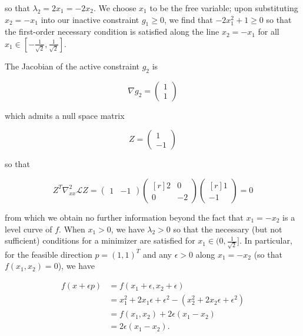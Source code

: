 \begin{solution}
    so that $\lambda_2 = 2 x_1 = -2 x_2$. We choose $x_1$ to be the free variable; upon substituting $x_2 = -x_1$ into 
    our inactive constraint $g_1 \ge 0$, we find that $-2 x_1^2 + 1 \ge 0$ so that the first-order necessary condition 
    is satisfied along the line $x_2 = -x_1$ for all $x_1 \in \left[ -\frac{1}{\sqrt{2}}, \frac{1}{\sqrt{2}} \right]$.

    The Jacobian of the active constraint $g_2$ is

    $$
    \nabla g_2 = \begin{pmatrix*}
        1 \\
        1
    \end{pmatrix*}
    $$

    which admits a null space matrix

    $$
    Z = \begin{pmatrix*}
         1 \\
        -1
    \end{pmatrix*}
    $$

    so that 

    $$
    Z^T \nabla_{xx}^2 \mathcal{L} Z = \begin{pmatrix*}
        1 & -1
    \end{pmatrix*} \begin{pmatrix*}[r]
        2 & 0 \\
        0 & -2
    \end{pmatrix*} \begin{pmatrix*}[r]
        1 \\
        -1
    \end{pmatrix*} = 0
    $$

    from which we obtain no further information beyond the fact that $x_1 = -x_2$ is a level curve of $f$. When 
    $x_1 > 0$, we have $\lambda_2 > 0$ so that the necessary (but not sufficient) conditions for a minimizer are 
    satisfied for $x_1 \in \mathopen( 0, \frac{1}{\sqrt{2}}\mathclose ]$. In particular, for the feasible direction 
    $p = (1, 1)^T$ and any $\epsilon > 0$ along $x_1 = -x_2$ (so that $f(x_1, x_2) = 0$), we have

    \begin{align*}
        f(x + \epsilon p) &= f(x_1 + \epsilon, x_2 + \epsilon) \\
                          &= x_1^2 + 2x_1 \epsilon + \epsilon^2 - (x_2^2 + 2x_2 \epsilon + \epsilon^2) \\
                          &= f(x_1, x_2) + 2 \epsilon (x_1 - x_2) \\
                          &= 2 \epsilon (x_1 - x_2).
    \end{align*}


\end{solution}

